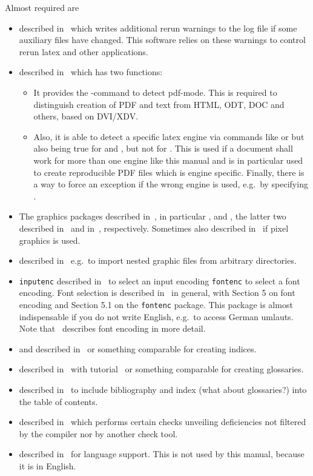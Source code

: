 \noindent
Almost required are 
%
\begin{itemize}
\item
{} described in~\cite{RerunFChkP} 
which writes additional rerun warnings to the log file 
if some auxiliary files have changed. 
This software relies on these warnings 
to control rerun latex and other applications. 
\item
{} described in~\cite{IfTeXP} which has two functions: 
\begin{itemize}
  \item 
  It provides the -command to detect pdf-mode. 
  This is required to distinguish creation of PDF and text 
  from HTML, ODT, DOC and others, based on DVI/XDV\@. 
  \item 
  Also, it is able to detect a specific latex engine via commands 
  like  or  but also  
  being true for \lualatex{} and \xelatex{}, but not for \pdflatex. 
  This is used if a document shall work for more than one engine 
  like this manual and is in particular used to create reproducible PDF files 
  which is engine specific. 
  Finally, there is a way to force an exception if the wrong engine is used, 
  e.g.~by specifying . 
\end{itemize}
\item
The graphics packages described in~\cite{GraX}, 
in particular ,  and , 
the latter two described in~\cite{XColorP} and in~\cite{TransP}, 
respectively. 
Sometimes also  described in~\cite{BmpP} 
if pixel graphics is used. 
\item
{} described in~\cite{ImpoP} 
e.g.~to import nested graphic files from arbitrary directories. 
\item
\texttt{inputenc} described in~\cite{InputencP} 
to select an input encoding 
\texttt{fontenc} to select a font encoding. 
Font selection is described in~\cite{FontSel} in general, 
with Section 5 on font encoding and 
Section 5.1 on the \texttt{fontenc} package. 
This package is almost indispensable if you do not write English, 
e.g.~to access German umlauts. 
Note that~\cite{FontEnc} describes font encoding in more detail. 
\item 
{} and  described in~\cite{MkidxShIdxP} 
or something comparable for creating indices. 
\item 
{} described in~\cite{GloP} 
with tutorial~\cite{GloPGuide}
or something comparable for creating glossaries. 
\item 
{} described in~\cite{TocBibIndP} 
to include bibliography and index (what about glossaries?) 
into the table of contents. 
\item 
{} described in~\cite{NagP} 
which performs certain checks unveiling deficiencies 
not filtered by the compiler nor by another check tool. 
\item 
{} described in~\cite{BabelP} for language support. 
This is not used by this manual, because it is in English. 
\end{itemize}

